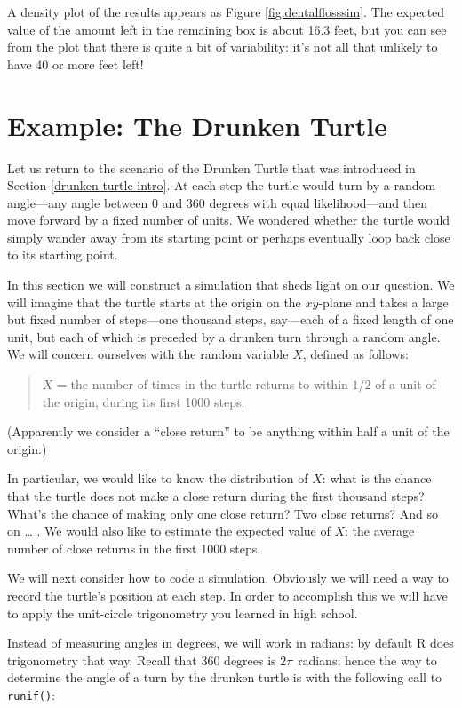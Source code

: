 \documentclass[]{book}
\theoremstyle{definition}
\theoremstyle{definition}
\theoremstyle{definition}
\theoremstyle{remark}
\begin{document}
{A density plot of the results appears as Figure
\ref{fig:dentalflosssim}. The expected value of the amount left in the
remaining box is about 16.3 feet, but you can see from the plot that
there is quite a bit of variability: it's not all that unlikely to have
40 or more feet left!

\section{Example: The Drunken Turtle}\label{drunken-turtle-sim}

Let us return to the scenario of the Drunken Turtle that was introduced
in Section \ref{drunken-turtle-intro}. At each step the turtle would
turn by a random angle---any angle between 0 and 360 degrees with equal
likelihood---and then move forward by a fixed number of units. We
wondered whether the turtle would simply wander away from its starting
point or perhaps eventually loop back close to its starting point.

In this section we will construct a simulation that sheds light on our
question. We will imagine that the turtle starts at the origin on the
\(xy\)-plane and takes a large but fixed number of steps---one thousand
steps, say---each of a fixed length of one unit, but each of which is
preceded by a drunken turn through a random angle. We will concern
ourselves with the random variable \(X\), defined as follows:

\begin{quote}
\(X\) = the number of times in the turtle returns to within \(1/2\) of a
unit of the origin, during its first 1000 steps.
\end{quote}

(Apparently we consider a ``close return'' to be anything within half a
unit of the origin.)

In particular, we would like to know the distribution of \(X\): what is
the chance that the turtle does not make a close return during the first
thousand steps? What's the chance of making only one close return? Two
close returns? And so on \ldots{} . We would also like to estimate the
expected value of \(X\): the average number of close returns in the
first 1000 steps.

We will next consider how to code a simulation. Obviously we will need a
way to record the turtle's position at each step. In order to accomplish
this we will have to apply the unit-circle trigonometry you learned in
high school.

Instead of measuring angles in degrees, we will work in radians: by
default R does trigonometry that way. Recall that 360 degrees is
\(2 \pi\) radians; hence the way to determine the angle of a turn by the
drunken turtle is with the following call to \texttt{runif()}:

}
\end{document}
